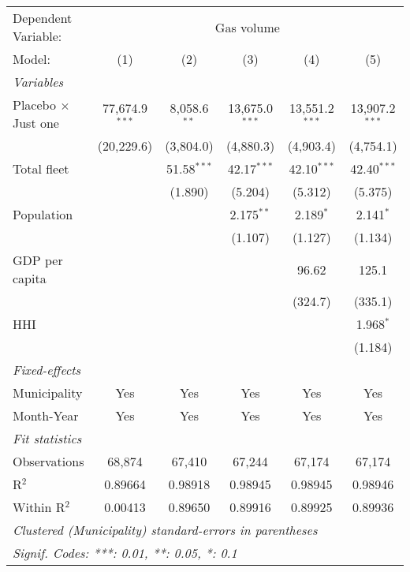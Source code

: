 \documentclass[
]{article}
\begin{document}
\begin{tabular}{lccccc}
\tabularnewline\midrule\midrule
Dependent Variable:&\multicolumn{5}{c}{Gas volume}\\
Model:&(1) & (2) & (3) & (4) & (5)\\
\midrule \emph{Variables}&   &   &   &   &  \\
Placebo $\times $ Just one & 77,674.9$^{***}$ & 8,058.6$^{**}$ & 13,675.0$^{***}$ & 13,551.2$^{***}$ & 13,907.2$^{***}$\\
  &(20,229.6) & (3,804.0) & (4,880.3) & (4,903.4) & (4,754.1)\\
Total fleet &    & 51.58$^{***}$ & 42.17$^{***}$ & 42.10$^{***}$ & 42.40$^{***}$\\
  &   & (1.890) & (5.204) & (5.312) & (5.375)\\
Population &    &    & 2.175$^{**}$ & 2.189$^{*}$ & 2.141$^{*}$\\
  &   &    & (1.107) & (1.127) & (1.134)\\
GDP per capita &    &    &    & 96.62 & 125.1\\
  &   &    &    & (324.7) & (335.1)\\
HHI &    &    &    &    & 1.968$^{*}$\\
  &   &    &    &    & (1.184)\\
\midrule \emph{Fixed-effects}&   &   &   &   &  \\
Municipality & Yes & Yes & Yes & Yes & Yes\\
Month-Year & Yes & Yes & Yes & Yes & Yes\\
\midrule \emph{Fit statistics}&  & & & & \\
Observations & 68,874&67,410&67,244&67,174&67,174\\
R$^2$ & 0.89664&0.98918&0.98945&0.98945&0.98946\\
Within R$^2$ & 0.00413&0.89650&0.89916&0.89925&0.89936\\
\midrule\midrule\multicolumn{6}{l}{\emph{Clustered (Municipality) standard-errors in parentheses}}\\
\multicolumn{6}{l}{\emph{Signif. Codes: ***: 0.01, **: 0.05, *: 0.1}}\\
\end{tabular}
\end{document}
